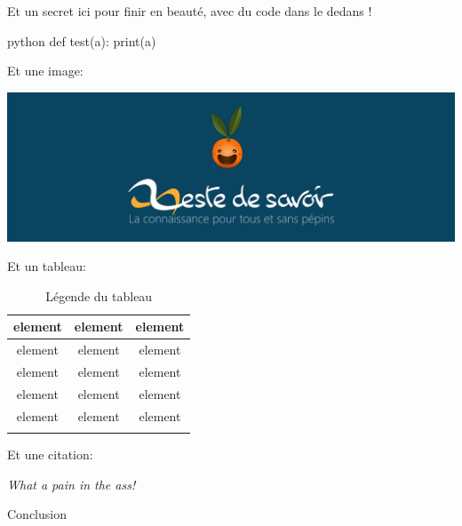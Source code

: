 \documentclass[small]{zmdocument}
\begin{document}
\levelOneConclusion

\begin{Spoiler}
Et un secret ici pour finir en beauté, avec du code dans le dedans !

\begin{CodeBlock}[][1]{python}
def test(a):
    print(a)
\end{CodeBlock}

Et une image:

\begin{center}
\includegraphics[width=\linewidth]{./test-images/logo.png}
\end{center}

Et un tableau:

\begin{longtabu}{|c|c|c|} \hline
element & element & element\\ \hline
element & element & element\\ \hline
element & element & element\\ \hline
element & element & element\\ \hline
element & element & element\\ \hline
\caption{Légende du tableau}
\end{longtabu}

Et une citation:

\begin{Quotation}[me]
\textit{What a pain in the ass!}
\end{Quotation}

\end{Spoiler}

Conclusion
\end{document}
